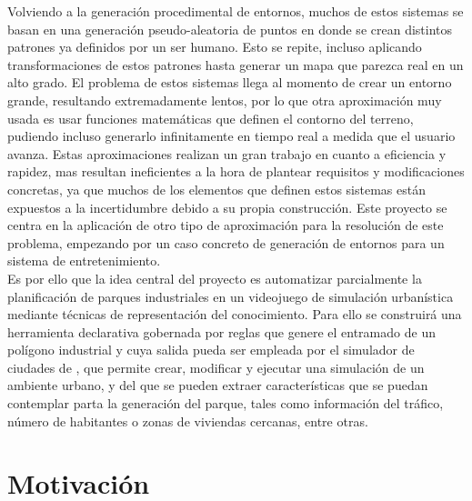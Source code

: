 Volviendo a la generación procedimental de entornos, muchos de estos sistemas se basan en una generación pseudo-aleatoria de puntos en donde se crean distintos patrones ya definidos por un ser humano. Esto se repite, incluso aplicando transformaciones de estos patrones hasta generar un mapa que parezca real en un alto grado. El problema de estos sistemas llega al momento de crear un entorno grande, resultando extremadamente lentos, por lo que otra aproximación muy usada es usar funciones matemáticas que definen el contorno del terreno, pudiendo incluso generarlo infinitamente en tiempo real a medida que el usuario avanza. Estas aproximaciones realizan un gran trabajo en cuanto a eficiencia y rapidez, mas resultan ineficientes a la hora de plantear requisitos y modificaciones concretas, ya que muchos de los elementos que definen estos sistemas están expuestos a la incertidumbre debido a su propia construcción. Este proyecto se centra en la aplicación de otro tipo de aproximación para la resolución de este problema, empezando por un caso concreto de generación de entornos para un sistema de entretenimiento. \\

Es por ello que la idea central del proyecto es automatizar parcialmente la planificación de parques industriales en un videojuego de simulación urbanística mediante técnicas de representación del conocimiento. Para ello se construirá una herramienta declarativa gobernada por reglas que genere el entramado de un polígono industrial y cuya salida pueda ser empleada por el simulador de ciudades de \cities, que permite crear, modificar y ejecutar una simulación de un ambiente urbano, y del que se pueden extraer características que se puedan contemplar parta la generación del parque, tales como información del tráfico, número de habitantes o zonas de viviendas cercanas, entre otras.

\section{Motivación}

